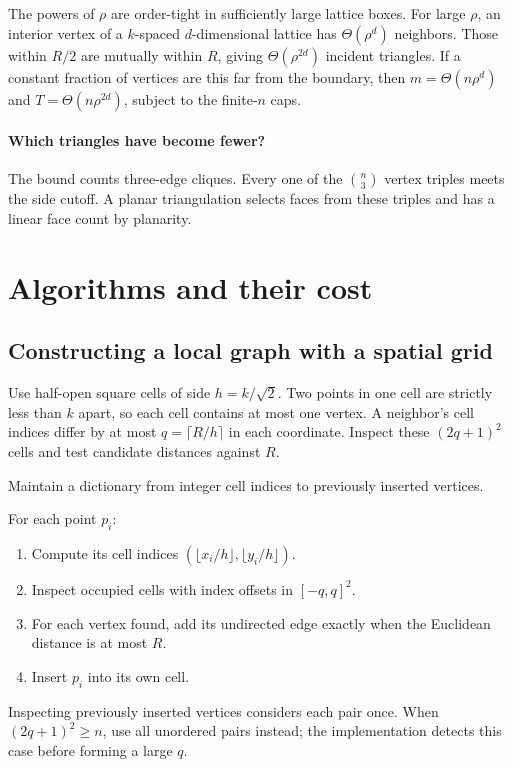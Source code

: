 \documentclass[11pt]{article}
\begin{document}
The powers of $\rho$ are order-tight in sufficiently large lattice boxes.
For large $\rho$, an interior vertex of a $k$-spaced $d$-dimensional lattice
has $\Theta(\rho^d)$ neighbors. Those within $R/2$ are mutually within
$R$, giving $\Theta(\rho^{2d})$ incident triangles. If a constant fraction
of vertices are this far from the boundary, then $m=\Theta(n\rho^d)$ and
$T=\Theta(n\rho^{2d})$, subject to the finite-$n$ caps.

\paragraph{Which triangles have become fewer?}
The bound counts three-edge cliques. Every one of the $\binom n3$ vertex
triples meets the side cutoff. A planar triangulation selects faces from
these triples and has a linear face count by planarity.

\section{Algorithms and their cost}
\subsection{Constructing a local graph with a spatial grid}
Use half-open square cells of side $h=k/\sqrt2$. Two points in one cell
are strictly less than $k$ apart, so each cell contains at most one vertex.
A neighbor's cell indices differ by at most $q=\lceil R/h\rceil$ in each
coordinate. Inspect these $(2q+1)^2$ cells and test candidate distances
against $R$.

\begin{construction}
Maintain a dictionary from integer cell indices to previously inserted
vertices.
\par\medskip
For each point $p_i$:
\renewcommand{\labelenumi}{\textcolor{routegreen}{\scriptsize\ttfamily 0\arabic{enumi}}}
\begin{enumerate}
\setlength{\itemsep}{6pt}
\setlength{\parskip}{0pt}
\setlength{\topsep}{4pt}
\item Compute its cell indices $(\lfloor x_i/h\rfloor,\lfloor y_i/h\rfloor)$.
\item Inspect occupied cells with index offsets in $[-q,q]^2$.
\item For each vertex found, add its undirected edge exactly when the
Euclidean distance is at most $R$.
\item Insert $p_i$ into its own cell.
\end{enumerate}
\end{construction}
Inspecting previously inserted vertices considers each pair once.
When $(2q+1)^2\ge n$, use all unordered pairs instead; the implementation
detects this case before forming a large $q$.
\end{document}
